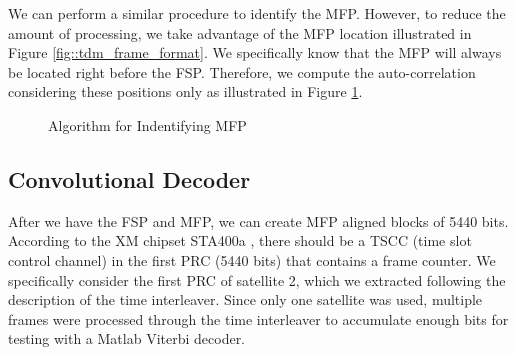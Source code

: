 \documentclass[conference,onecolumn]{IEEEtran}
\begin{document}
We can perform a similar procedure to identify the MFP. However, to reduce the amount of processing, we take advantage of the MFP location illustrated in Figure \ref{fig::tdm_frame_format}. We specifically know that the MFP will always be located right before the FSP. Therefore, we compute the auto-correlation considering these positions only as illustrated in Figure \ref{fig::finding_mfp}.

\begin{figure}[H]
	\centerline{}
	\caption{Algorithm for Indentifying MFP}
	\label{fig::finding_mfp}
\end{figure}

\subsection{Convolutional Decoder}


After we have the FSP and MFP, we can create MFP aligned blocks of 5440 bits. According to the XM chipset STA400a \cite{alldatasheetcom_2015_sta400a}, there should be a TSCC (time slot control channel) in the first PRC (5440 bits) that contains a frame counter. We specifically consider the first PRC of satellite 2, which we extracted following the description of the time interleaver. Since only one satellite was used, multiple frames were processed through the time interleaver to accumulate enough bits for testing with a Matlab Viterbi decoder.
\end{document}
